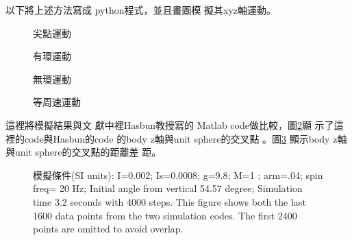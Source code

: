 \documentclass[12pt,a4paper]{article}
\begin{document}
以下將上述方法寫成%
python程式，並且畫圖模%
擬其xyz軸運動。

\begin{figure}[th]
\caption{尖點運動}
\begin{center}
\end{center}
\end{figure}

\begin{figure}[th]
\caption{有環運動}
\begin{center}
\end{center}
\end{figure}

\begin{figure}[th]
\caption{無環運動}
\begin{center}
\end{center}
\end{figure}

\begin{figure}[th]
\caption{等周速運動}
\label{figure_uniform}
\begin{center}
\end{center}
\end{figure}

這裡將模擬結果與文%
獻中\cite{hasbun}裡Hasbun教授寫的%
Matlab code做比較，圖\ref{compare}顯%
示了這裡的code與Hasbun的code%
的body z軸與unit sphere的交叉點%
。圖\ref{compare2} 顯示body z軸與unit
sphere的交叉點的距離差%
距。 
\begin{figure}[th]
\caption{{}模擬條件(SI units): I=0.002; Is=0.0008;
g=9.8; M=1 ; arm=.04; spin freq= 20 Hz; Initial angle from vertical 54.57
degree; Simulation time 3.2 seconds with 4000 steps. This figure shows both
the last 1600 data points from the two simulation codes. The first 2400
points are omitted to avoid overlap.}
\label{compare}
\begin{center}
\end{center}
\end{figure}
\begin{figure}[th]
\caption{{}}
\label{compare2}
\begin{center}
\end{center}
\end{figure}
\end{document}
